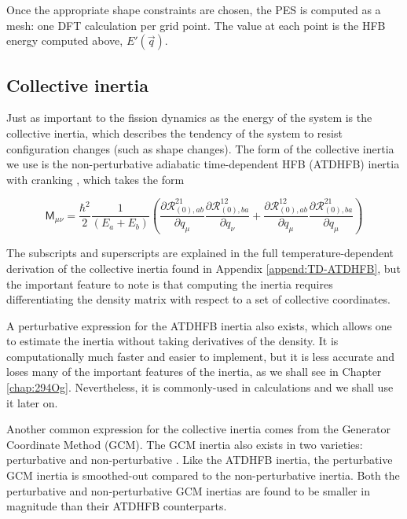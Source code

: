 Once the appropriate shape constraints are chosen, the PES is computed as a mesh: one DFT calculation per grid point. The value at each point is the HFB energy computed above, $E'(\vec{q})$.

\subsection{Collective inertia}
Just as important to the fission dynamics as the energy of the system is the collective inertia, which describes the tendency of the system to resist configuration changes (such as shape changes). The form of the collective inertia we use is the non-perturbative adiabatic time-dependent HFB (ATDHFB) inertia with cranking \cite{Baran2011}, which takes the form

\begin{equation}\label{eq:mATDHFB-np}
\mathsf{M}_{\mu\nu} =  \frac{\hbar^2}{2}\frac{1}{(E_a+E_b)}\left(\frac{\partial\mathcal{R}^{21}_{(0),ab}}{\partial q_\mu}\frac{\partial\mathcal{R}^{12}_{(0),ba}}{\partial q_\nu}+\frac{\partial\mathcal{R}^{12}_{(0),ab}}{\partial q_\mu}\frac{\partial\mathcal{R}^{21}_{(0),ba}}{\partial q_\mu}\right)
\end{equation}

\noindent The subscripts and superscripts are explained in the full temperature-dependent derivation of the collective inertia found in Appendix \ref{append:TD-ATDHFB}, but the important feature to note is that computing the inertia requires differentiating the density matrix with respect to a set of collective coordinates.

A perturbative expression for the ATDHFB inertia also exists, which allows one to estimate the inertia without taking derivatives of the density. It is computationally much faster and easier to implement, but it is less accurate and loses many of the important features of the inertia, as we shall see in Chapter \ref{chap:294Og}. Nevertheless, it is commonly-used in calculations and we shall use it later on.

Another common expression for the collective inertia comes from the Generator Coordinate Method (GCM). The GCM inertia also exists in two varieties: perturbative and non-perturbative \cite{Giuliani2018b}. Like the ATDHFB inertia, the perturbative GCM inertia is smoothed-out compared to the non-perturbative inertia. Both the perturbative and non-perturbative GCM inertias are found to be smaller in magnitude than their ATDHFB counterparts.

